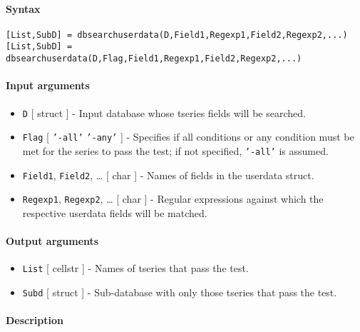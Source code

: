 


	\paragraph{Syntax}\label{syntax}

\begin{verbatim}
[List,SubD] = dbsearchuserdata(D,Field1,Regexp1,Field2,Regexp2,...)
[List,SubD] = dbsearchuserdata(D,Flag,Field1,Regexp1,Field2,Regexp2,...)
\end{verbatim}

\paragraph{Input arguments}\label{input-arguments}

\begin{itemize}
\item
  \texttt{D} {[} struct {]} - Input database whose tseries fields will
  be searched.
\item
  \texttt{Flag} {[} \texttt{'-all'} \textbar{} \texttt{'-any'} {]} -
  Specifies if all conditions or any condition must be met for the
  series to pass the test; if not specified, \texttt{'-all'} is assumed.
\item
  \texttt{Field1}, \texttt{Field2}, \ldots{} {[} char {]} - Names of
  fields in the userdata struct.
\item
  \texttt{Regexp1}, \texttt{Regexp2}, \ldots{} {[} char {]} - Regular
  expressions against which the respective userdata fields will be
  matched.
\end{itemize}

\paragraph{Output arguments}\label{output-arguments}

\begin{itemize}
\item
  \texttt{List} {[} cellstr {]} - Names of tseries that pass the test.
\item
  \texttt{Subd} {[} struct {]} - Sub-database with only those tseries
  that pass the test.
\end{itemize}

\paragraph{Description}\label{description}

